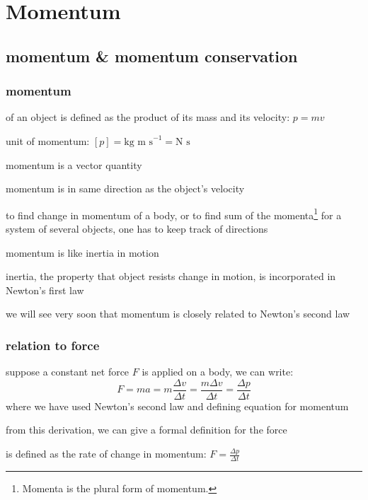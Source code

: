 \section{Momentum}

\subsection{momentum \& momentum conservation}

\subsubsection{momentum}

\begin{ilight}
	\centering {} of an object is defined as the product of its mass and its velocity: $\boxed{p=mv}$ 
\end{ilight}

\cmt unit of momentum: $[p]=\text{kg m s}^{-1} = \text{N s}$

\cmt momentum is a vector quantity

momentum is in same direction as the object's velocity

to find change in momentum of a body, or to find sum of the momenta\footnote{Momenta is the plural form of momentum.} for a system of several objects, one has to keep track of directions

\cmt momentum is like inertia in motion

inertia, the property that object resists change in motion, is incorporated in Newton's first law

we will see very soon that momentum is closely related to Newton's second law

\subsubsection{relation to force}

suppose a constant net force $F$ is applied on a body, we can write:
\begin{equation*}
	F = ma = m\frac{\Delta v}{\Delta t} = \frac{m\Delta v}{\Delta t} = \frac{\Delta p}{\Delta t}
\end{equation*}
where we have used Newton's second law and defining equation for momentum

from this derivation, we can give a formal definition for the force

\begin{ilight}
	\centering {} is defined as the rate of change in momentum: $\boxed{F = \frac{\Delta p}{\Delta t}}$ 
\end{ilight}





